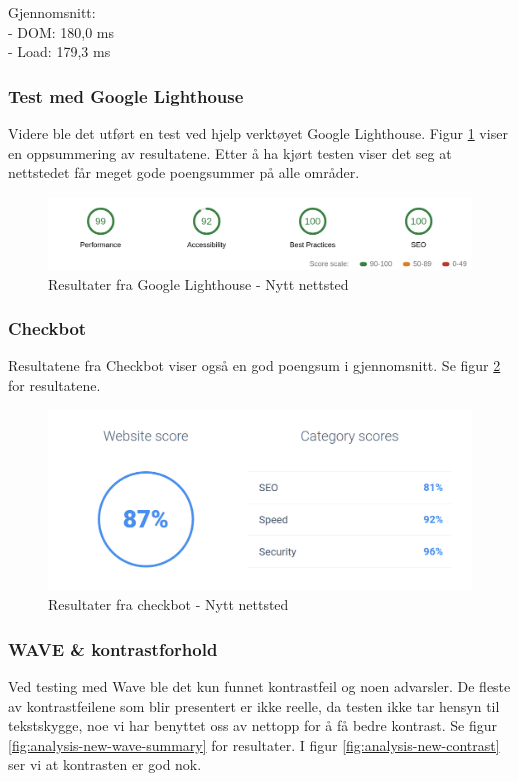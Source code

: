 Gjennomsnitt:\\
- DOM: 180,0 ms\\
- Load: 179,3 ms

\subsubsection{Test med Google Lighthouse}
Videre ble det utført en test ved hjelp verktøyet Google Lighthouse. Figur \ref{fig:analysis-new-lightouse-summary} viser en oppsummering av resultatene. Etter å ha kjørt testen viser det seg at nettstedet får meget gode poengsummer på alle områder. 

\begin{figure}[H]
    \centering
    \includegraphics[width=\textwidth]{bjornar/Lighthouse-Report-mobile-new.png}
    \caption{Resultater fra Google Lighthouse - Nytt nettsted}
    \label{fig:analysis-new-lightouse-summary}
\end{figure}

\subsubsection{Checkbot}
Resultatene fra Checkbot viser også en god poengsum i gjennomsnitt. Se figur \ref{fig:analysis-new-checkbot-summary} for resultatene.

\begin{figure}[H]
    \centering
    \includegraphics[width=\textwidth]{bjornar/checkbotio-summary-new.png}
    \caption{Resultater fra checkbot - Nytt nettsted}
    \label{fig:analysis-new-checkbot-summary}
\end{figure}

\subsubsection{WAVE \& kontrastforhold}
Ved testing med Wave ble det kun funnet kontrastfeil og noen advarsler. De fleste av kontrastfeilene som blir presentert er ikke reelle, da testen ikke tar hensyn til tekstskygge, noe vi har benyttet oss av nettopp for å få bedre kontrast. Se figur \ref{fig:analysis-new-wave-summary} for resultater. I figur \ref{fig:analysis-new-contrast} ser vi at kontrasten er god nok.

